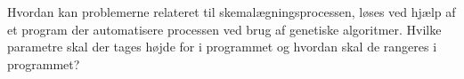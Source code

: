 Hvordan kan problemerne relateret til skemalægningsprocessen, løses ved hjælp af et program der automatisere processen ved brug af genetiske algoritmer. Hvilke parametre skal der tages højde for i programmet og hvordan skal de rangeres i programmet?